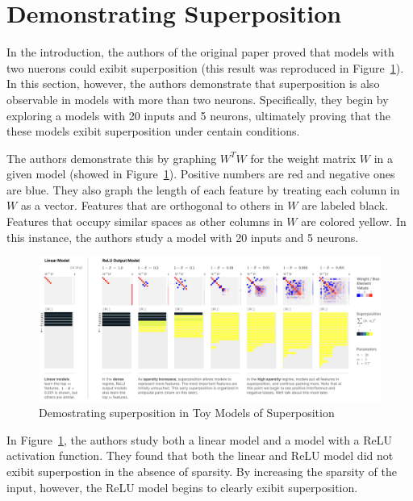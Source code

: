 \documentclass{article} %
\begin{document}
\section{Demonstrating Superposition}

In the introduction, the authors of the original paper proved that models with two nuerons could exibit
superposition (this result was reproduced in Figure~\ref{fig:section3_anthropic}).
In this section, however, the authors demonstrate that superposition
is also observable in models with more than two neurons. Specifically, they begin by
exploring a models with 20 inputs and 5 neurons, ultimately proving that the these
models exibit superposition under centain conditions.\newline

The authors demonstrate this by graphing $W^TW$ for the weight matrix $W$ in a given
model (showed in Figure~\ref{fig:section3_anthropic}). Positive numbers are red and negative ones are blue. 
They also graph the length of each feature by treating each column in $W$ as a vector. 
Features that are orthogonal to others in $W$ are labeled black. Features that 
occupy similar spaces as other columns in $W$ are colored yellow. In this instance, the authors study a model
with 20 inputs and 5 neurons.\\

\begin{figure}[h]
    \centering
    \includegraphics[width=0.9\linewidth]{demonstrating_superposition/images/anthropic_section3.png}
    \captionsetup{font=footnotesize} %
    \caption{Demostrating superposition in Toy Models of Superposition \cite{elhage2022toy}}
    \label{fig:section3_anthropic}
\end{figure}

In Figure~\ref{fig:section3_anthropic}, the authors study both a linear model
and a model with a ReLU activation function. They found that both the linear
and ReLU model did not exibit superpostion in the absence of sparsity. By 
increasing the sparsity of the input, however, the ReLU model begins to clearly 
exibit superposition.\\ 
\end{document}
